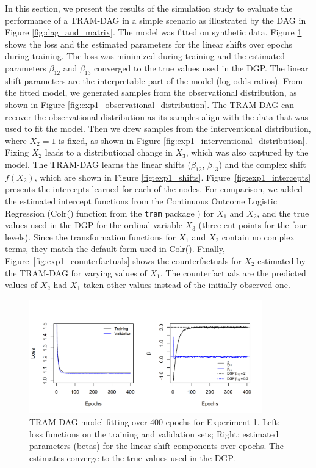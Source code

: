 In this section, we present the results of the simulation study to evaluate the performance of a TRAM-DAG in a simple scenario as illustrated by the DAG in Figure \ref{fig:dag_and_matrix}. The model was fitted on synthetic data. Figure \ref{fig:exp1_loss_parameters} shows the loss and the estimated parameters for the linear shifts over epochs during training. The loss was minimized during training and the estimated parameters $\beta_{12}$ and $\beta_{13}$ converged to the true values used in the DGP. The linear shift parameters are the interpretable part of the model (log-odds ratios). 
From the fitted model, we generated samples from the observational distribution, as shown in Figure \ref{fig:exp1_observational_distribution}. The TRAM-DAG can recover the observational distribution as its samples align with the data that was used to fit the model. Then we drew samples from the interventional distribution, where $X_2 = 1$ is fixed, as shown in Figure \ref{fig:exp1_interventional_distribution}. Fixing $X_2$ leads to a distributional change in $X_3$, which was also captured by the model. The TRAM-DAG learns the linear shifts ($\beta_{12}$, $\beta_{13}$) and the complex shift $f(X_2)$, which are shown in Figure \ref{fig:exp1_shifts}. Figure~\ref{fig:exp1_intercepts} presents the intercepts learned for each of the nodes. For comparison, we added the estimated intercept functions from the Continuous Outcome Logistic Regression (Colr() function from the \texttt{tram} package \citep{hothorn2018}) for $X_1$ and $X_2$, and the true values used in the DGP for the ordinal variable $X_3$ (three cut-points for the four levels). Since the transformation functions for $X_1$ and $X_2$ contain no complex terms, they match the default form used in Colr(). Finally, Figure~\ref{fig:exp1_counterfactuals} shows the counterfactuals for $X_2$ estimated by the TRAM-DAG for varying values of $X_1$. The counterfactuals are the predicted values of $X_2$ had $X_1$ taken other values instead of the initially observed one. 

\begin{figure}[htbp]
\centering
\includegraphics[width=0.9\textwidth]{img/exp1_loss_parameters.png}
\caption{TRAM-DAG model fitting over 400 epochs for Experiment 1. Left: loss functions on the training and validation sets; Right: estimated parameters (betas) for the linear shift components over epochs. The estimates converge to the true values used in the DGP.}
\label{fig:exp1_loss_parameters}
\end{figure}



